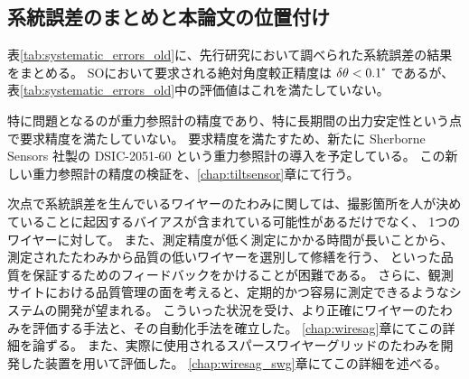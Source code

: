 \documentclass[../../main.tex]{subfiles}
\begin{document}
\subsection{系統誤差のまとめと本論文の位置付け}
表\ref{tab:systematic_errors_old}に、先行研究において調べられた系統誤差の結果をまとめる。
SOにおいて要求される絶対角度較正精度は $\delta\theta < 0.1\tcdegree$ であるが、
表\ref{tab:systematic_errors_old}中の評価値はこれを満たしていない。

特に問題となるのが重力参照計の精度であり、特に長期間の出力安定性という点で要求精度を満たしていない。
要求精度を満たすため、新たに Sherborne Sensors 社製の DSIC-2051-60 という重力参照計の導入を予定している。
この新しい重力参照計の精度の検証を、\ref{chap:tiltsensor}章にて行う。

次点で系統誤差を生んでいるワイヤーのたわみに関しては、撮影箇所を人が決めていることに起因するバイアスが含まれている可能性があるだけでなく、
1つのワイヤーに対して。
また、測定精度が低く測定にかかる時間が長いことから、測定されたたわみから品質の低いワイヤーを選別して修繕を行う、
といった品質を保証するためのフィードバックをかけることが困難である。
さらに、観測サイトにおける品質管理の面を考えると、定期的かつ容易に測定できるようなシステムの開発が望まれる。
こういった状況を受け、より正確にワイヤーのたわみを評価する手法と、その自動化手法を確立した。
\ref{chap:wiresag}章にてこの詳細を論ずる。
また、実際に使用されるスパースワイヤーグリッドのたわみを開発した装置を用いて評価した。
\ref{chap:wiresag_swg}章にてこの詳細を述べる。
\end{document}
